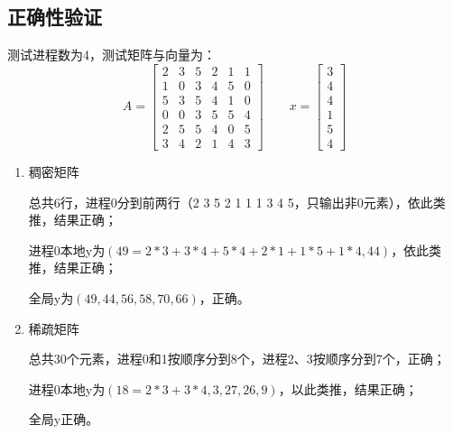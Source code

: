 \documentclass[UTF8,a4paper,12pt]{article}
\begin{document}
\subsection{正确性验证}
测试进程数为4，测试矩阵与向量为：
\begin{equation}
  A =
 \begin{bmatrix}
   2 & 3 & 5 & 2 & 1 & 1\\
   1 & 0 & 3 & 4 & 5 & 0\\
   5 & 3 & 5 & 4 & 1 & 0\\
   0 & 0 & 3 & 5 & 5 & 4\\
   2 & 5 & 5 & 4 & 0 & 5\\
   3 & 4 & 2 & 1 & 4 & 3
  \end{bmatrix} \qquad
  x =
  \begin{bmatrix}
    3\\
    4\\
    4\\
    1\\
    5\\
    4
    \end{bmatrix}
\end{equation}
\begin{enumerate}[itemindent=0.5em,label=\arabic*、]
  \item 稠密矩阵
  \par 总共6行，进程0分到前两行（2 3 5 2 1 1 1 3 4 5，只输出非0元素），依此类推，结果正确；
  \par 进程0本地y为$(49=2*3+3*4+5*4+2*1+1*5+1*4,44)$，依此类推，结果正确；
  \par 全局y为$(49,44,56,58,70,66)$，正确。
  \begin{figure}[H]
  \centering
  \end{figure}

  \item 稀疏矩阵
  \par 总共30个元素，进程0和1按顺序分到8个，进程2、3按顺序分到7个，正确；
  \par 进程0本地y为$(18=2*3+3*4,3,27,26,9)$，以此类推，结果正确；
  \par 全局y正确。

  \begin{figure}[H]
  \centering
  \end{figure}
\end{enumerate}
\end{document}
